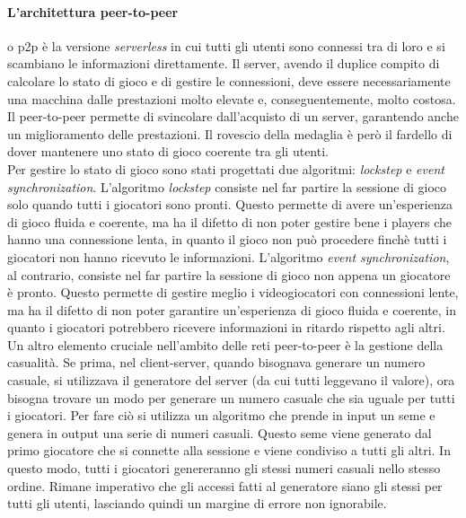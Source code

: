         \paragraph{L'architettura peer-to-peer} o p2p è la versione \textit{serverless} in cui tutti gli utenti sono connessi tra di loro e si scambiano le 
            informazioni direttamente. Il server, avendo il duplice compito di calcolare lo stato di gioco e di gestire le connessioni, deve essere necessariamente una macchina 
            dalle prestazioni molto elevate e, conseguentemente, molto costosa. Il peer-to-peer permette di svincolare dall'acquisto di un server, garantendo anche un miglioramento 
            delle prestazioni. Il rovescio della medaglia è però il fardello di dover mantenere uno stato di gioco coerente tra gli utenti.\\
            Per gestire lo stato di gioco sono stati progettati due algoritmi: \textit{lockstep} e \textit{event synchronization}. L'algoritmo \textit{lockstep} consiste nel far 
            partire la sessione di gioco solo quando tutti i giocatori sono pronti. Questo permette di avere un'esperienza di gioco fluida e coerente, ma ha il difetto di non poter 
            gestire bene i players che hanno una connessione lenta, in quanto il gioco non può procedere finchè tutti i giocatori
            non hanno ricevuto le informazioni. L'algoritmo \textit{event synchronization}, al contrario, consiste nel far partire la sessione di gioco non appena un giocatore è
            pronto. Questo permette di gestire meglio i videogiocatori con connessioni lente, ma ha il difetto di non poter garantire un'esperienza di gioco fluida e coerente, in quanto
            i giocatori potrebbero ricevere informazioni in ritardo rispetto agli altri.\\
            Un altro elemento cruciale nell'ambito delle reti peer-to-peer è la gestione della casualità. Se prima, nel client-server, quando bisognava generare un numero casuale, 
            si utilizzava il generatore del server (da cui tutti leggevano il valore), ora bisogna trovare un modo per generare un numero casuale che sia uguale per tutti i giocatori.
            Per fare ciò si utilizza un algoritmo che prende in input un seme e genera in output una serie di numeri casuali. Questo seme viene generato dal primo giocatore che si connette
            alla sessione e viene condiviso a tutti gli altri. In questo modo, tutti i giocatori genereranno gli stessi numeri casuali nello stesso ordine. Rimane
            imperativo che gli accessi fatti al generatore siano gli stessi per tutti gli utenti, lasciando quindi un margine di errore non ignorabile.\\
    
